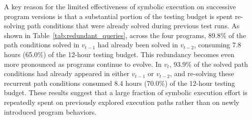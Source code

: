A key reason for the limited effectiveness of symbolic execution on successive program versions is that a substantial portion of the testing budget is spent re-solving path conditions that were already solved during previous test runs. As shown in Table~\ref{tab:redundant_queries}, across the four programs, 89.8\% of the path conditions solved in $v_{t-1}$ had already been solved in $v_{t-2}$, consuming 7.8 hours (65.0\%) of the 12-hour testing budget. This redundancy becomes even more pronounced as programs continue to evolve. In $v_t$, 93.9\% of the solved path conditions had already appeared in either $v_{t-1}$ or $v_{t-2}$, and re-solving these recurrent path conditions consumed 8.4 hours (70.0\%) of the 12-hour testing budget. These results suggest that a large fraction of symbolic execution effort is repeatedly spent on previously explored execution paths rather than on newly introduced program behaviors.

